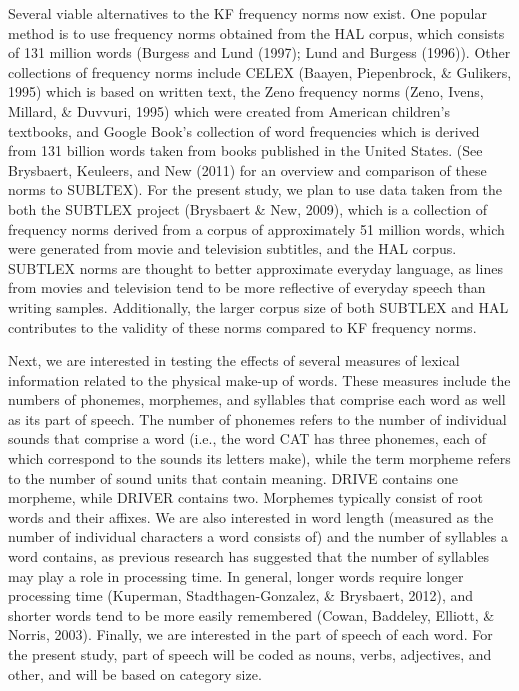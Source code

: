 \documentclass[english,man]{apa6}
\theoremstyle{definition}
\theoremstyle{definition}
\theoremstyle{definition}
\theoremstyle{remark}
\begin{document}
Several viable alternatives to the KF frequency norms now exist. One
popular method is to use frequency norms obtained from the HAL corpus,
which consists of 131 million words (Burgess and Lund (1997); Lund and
Burgess (1996)). Other collections of frequency norms include CELEX
(Baayen, Piepenbrock, \& Gulikers, 1995) which is based on written text,
the Zeno frequency norms (Zeno, Ivens, Millard, \& Duvvuri, 1995) which
were created from American children's textbooks, and Google Book's
collection of word frequencies which is derived from 131 billion words
taken from books published in the United States. (See Brysbaert,
Keuleers, and New (2011) for an overview and comparison of these norms
to SUBLTEX). For the present study, we plan to use data taken from the
both the SUBTLEX project (Brysbaert \& New, 2009), which is a collection
of frequency norms derived from a corpus of approximately 51 million
words, which were generated from movie and television subtitles, and the
HAL corpus. SUBTLEX norms are thought to better approximate everyday
language, as lines from movies and television tend to be more reflective
of everyday speech than writing samples. Additionally, the larger corpus
size of both SUBTLEX and HAL contributes to the validity of these norms
compared to KF frequency norms.

Next, we are interested in testing the effects of several measures of
lexical information related to the physical make-up of words. These
measures include the numbers of phonemes, morphemes, and syllables that
comprise each word as well as its part of speech. The number of phonemes
refers to the number of individual sounds that comprise a word (i.e.,
the word CAT has three phonemes, each of which correspond to the sounds
its letters make), while the term morpheme refers to the number of sound
units that contain meaning. DRIVE contains one morpheme, while DRIVER
contains two. Morphemes typically consist of root words and their
affixes. We are also interested in word length (measured as the number
of individual characters a word consists of) and the number of syllables
a word contains, as previous research has suggested that the number of
syllables may play a role in processing time. In general, longer words
require longer processing time (Kuperman, Stadthagen-Gonzalez, \&
Brysbaert, 2012), and shorter words tend to be more easily remembered
(Cowan, Baddeley, Elliott, \& Norris, 2003). Finally, we are interested
in the part of speech of each word. For the present study, part of
speech will be coded as nouns, verbs, adjectives, and other, and will be
based on category size.
\end{document}
